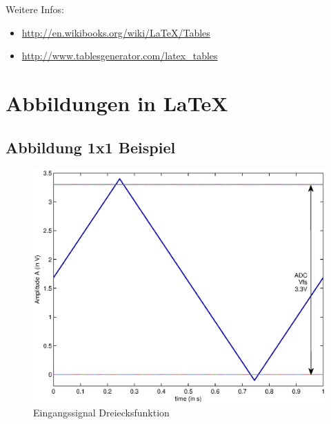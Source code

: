 \documentclass[TGAI_Laborbericht.tex]{subfiles}
\begin{document}
Weitere Infos:
\begin{itemize}
  \item \href{http://en.wikibooks.org/wiki/LaTeX/Tables}{http://en.wikibooks.org/wiki/LaTeX/Tables}
  \item \href{http://www.tablesgenerator.com/latex\_tables}{http://www.tablesgenerator.com/latex\_tables}
\end{itemize}

\newpage

\section{Abbildungen in \LaTeX}

\subsection{Abbildung 1x1 Beispiel}
\begin{figure}[H]
	\centering\small
	\includegraphics[width=\textwidth]{media/matlab/HISTOGRAM/ramp_fkt_samples_5000.eps}
	\caption{Eingangssignal Dreiecksfunktion}
	\label{fig:GRUNDL_RAMP_SIN_HIST_1X1}
\end{figure}
~
\end{document}
